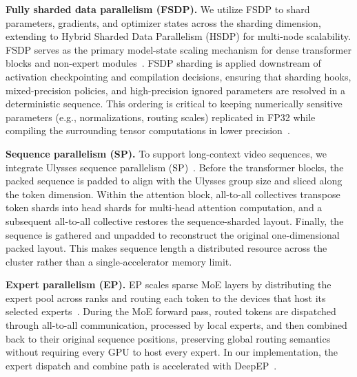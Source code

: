 \noindent\textbf{Fully sharded data parallelism (FSDP).}
We utilize FSDP to shard parameters, gradients, and optimizer states across the sharding dimension, extending to Hybrid Sharded Data Parallelism (HSDP) for multi-node scalability.
FSDP serves as the primary model-state scaling mechanism for dense transformer blocks and non-expert modules~\cite{rajbhandari2020zero,zhao2023pytorchfsdp}.
FSDP sharding is applied downstream of activation checkpointing and compilation decisions, ensuring that sharding hooks, mixed-precision policies, and high-precision ignored parameters are resolved in a deterministic sequence.
This ordering is critical to keeping numerically sensitive parameters (e.g., normalizations, routing scales) replicated in FP32 while compiling the surrounding tensor computations in lower precision~\cite{dehghani2023vit22b}.

\noindent\textbf{Sequence parallelism (SP).}
To support long-context video sequences, we integrate Ulysses sequence parallelism (SP)~\cite{jacobs2023deepspeed}.
Before the transformer blocks, the packed sequence is padded to align with the Ulysses group size and sliced along the token dimension.
Within the attention block, all-to-all collectives transpose token shards into head shards for multi-head attention computation, and a subsequent all-to-all collective restores the sequence-sharded layout.
Finally, the sequence is gathered and unpadded to reconstruct the original one-dimensional packed layout.
This makes sequence length a distributed resource across the cluster rather than a single-accelerator memory limit.

\noindent\textbf{Expert parallelism (EP).}
EP scales sparse MoE layers by distributing the expert pool across ranks and routing each token to the devices that host its selected experts~\cite{shazeer2017moe,lepikhin2020gshard,switchtransformer,rajbhandari2022deepspeedmoe,hwang2022tutel,deepseek2024v3}.
During the MoE forward pass, routed tokens are dispatched through all-to-all communication, processed by local experts, and then combined back to their original sequence positions, preserving global routing semantics without requiring every GPU to host every expert.
In our implementation, the expert dispatch and combine path is accelerated with DeepEP~\cite{deepep2025}.

